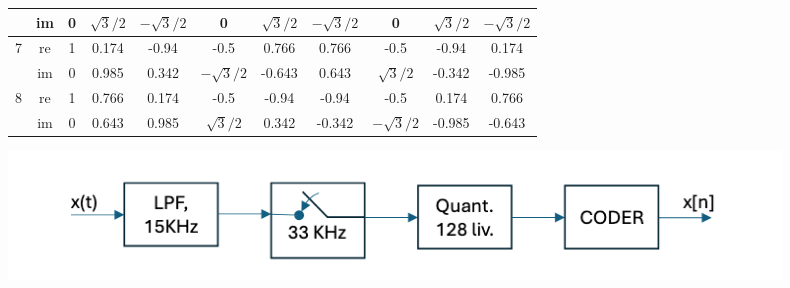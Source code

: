 \begin{center}
\begin{tabular}{| c c c c c c c c c c c |}
		                           & im                           & 0                            & $\sqrt{3}/2$                 & $-\sqrt{3}/2$                & 0                            & $\sqrt{3}/2$                 & $-\sqrt{3}/2$                & 0                            & $\sqrt{3}/2$                  & $-\sqrt{3}/2$ \\
		\hline\hline
		\multirow{2}{*}{7}         & re                           & 1                            & 0.174                        & -0.94                        & -0.5                         & 0.766                        & 0.766                        & -0.5                         & -0.94                         & 0.174         \\
		                           & im                           & 0                            & 0.985                        & 0.342                        & $-\sqrt{3}/2$                & -0.643                       & 0.643                        & $\sqrt{3}/2$                 & -0.342                        & -0.985        \\
		\hline\hline
		\multirow{2}{*}{8}         & re                           & 1                            & 0.766                        & 0.174                        & -0.5                         & -0.94                        & -0.94                        & -0.5                         & 0.174                         & 0.766         \\
		                           & im                           & 0                            & 0.643                        & 0.985                        & $\sqrt{3}/2$                 & 0.342                        & -0.342                       & $-\sqrt{3}/2$                & -0.985                        & -0.643        \\
		\hline
	\end{tabular}
\end{center}
\begin{center}
	\includegraphics[width=0.9\textwidth]{Images/Esempio campionamento.png }
\end{center}

